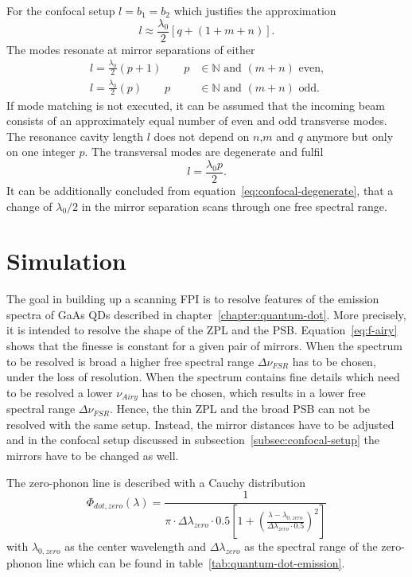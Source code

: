 For the confocal setup $l=b_1=b_2$ which justifies the approximation
\begin{equation}
l \approx \frac{\lambda_0}{2} \left[q + \left(1+m+n\right)\right].
\end{equation}
The modes resonate at mirror separations of either
\begin{align}
l = \frac{\lambda_0}{2}(p+1) \qquad p&\in\mathbb{N} \textrm{ and } (m+n) \textrm{ even,} \\
l = \frac{\lambda_0}{2}(p) \qquad p&\in\mathbb{N} \textrm{ and } (m+n) \textrm{ odd.}
\end{align}
If mode matching is not executed, it can be assumed that the incoming beam consists of an approximately equal number of even and odd transverse modes.
The resonance cavity length $l$ does not depend on $n$,$m$ and $q$ anymore but only on one integer $p$. The transversal modes are degenerate and fulfil
\begin{equation}
\label{eq:confocal-degenerate}
l = \frac{\lambda_0 p}{2}.	
\end{equation}
It can be additionally concluded from equation~\eqref{eq:confocal-degenerate}, that a change of $\lambda_0/2$ in the mirror separation scans through one free spectral range.
\section{Simulation}

The goal in building up a scanning \acl{FPI} is to resolve features of the emission spectra of \ac{GaAs} \aclp{QD} described in chapter~\ref{chapter:quantum-dot}. More precisely, it is intended to resolve the shape of the \ac{ZPL} and the \ac{PSB}.
Equation~\ref{eq:f-airy} shows that the finesse is constant for a given pair of mirrors.
When the spectrum to be resolved is broad a higher free spectral range $\Delta \nu_{FSR}$ has to be chosen, under the loss of resolution.
When the spectrum contains fine details which need to be resolved a lower $\nu_{Airy}$ has to be chosen, which results in a lower free spectral range $\Delta \nu_{FSR}$.
Hence, the thin \ac{ZPL} and the broad \ac{PSB} can not be resolved with the same setup.
Instead, the mirror distances have to be adjusted and in the confocal setup discussed in subsection~\ref{subsec:confocal-setup} the mirrors have to be changed as well.

The zero-phonon line is described with a Cauchy distribution
\begin{equation}
\Phi_{dot,zero}(\lambda) = \frac{1}{\pi \cdot \Delta\lambda_{zero} \cdot 0.5 \left[1+\left(\frac{\lambda - \lambda_{0, zero}}{\Delta\lambda_{zero} \cdot 0.5}\right)^2\right]}
\end{equation}
with $\lambda_{0, zero}$ as the center wavelength and $\Delta\lambda_{zero}$ as the spectral range of the zero-phonon line which can be found in table~\ref{tab:quantum-dot-emission}.

